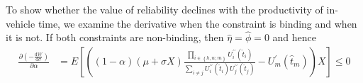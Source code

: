 \documentclass[12pt,a4paper,british]{article}
\makeatletter
\newenvironment{proof}[1][\proofname]{\par
    \normalfont\topsep6\p@\@plus6\p@\relax
    \trivlist
    \itemindent\parindent
    \item[\hskip\labelsep
          \scshape
      #1]\ignorespaces
  }{%
    \endtrivlist\@endpefalse
  }
\providecommand{\proofname}{Proof}
\makeatother
\begin{document}
\begin{proof}
To show whether the value of reliability declines with the productivity of in-vehicle time, we examine the derivative when the constraint is binding and when it is not. If both constraints are non-binding, then $\hat{\eta}=\hat{\phi}=0$ and hence 
\begin{align*}
\frac{\partial\left(-\frac{\mathrm{d}W}{\mathrm{d}\sigma}\right)}{\partial\alpha} &= E\left[\left(\left(1-\alpha\right)\left(\mu+\sigma X\right) \frac{\prod_{i \in \left\{ h,w,m\right\}  }U_{i}^{\prime\prime}\left(\hat{t}_{i}\right)}{\sum_{i\neq j}U_{i}^{\prime\prime}\left(\hat{t}_{i}\right)U_{j}^{\prime\prime}\left(\hat{t}_{j}\right)}-U_{m}^{\prime}\left(\hat{t}_{m}\right)\right)X\right] \leq 0

\end{align*}
\end{proof}
\end{document}
